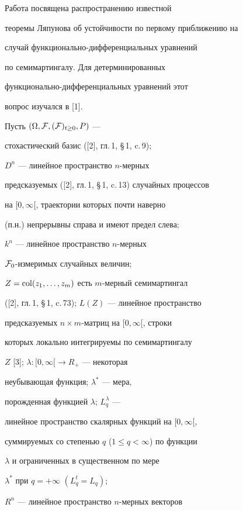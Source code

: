 \label{begin}








Работа посвящена распространению известной


теоремы Ляпунова об устойчивости по первому приближению на


случай функционально-дифференциальных уравнений


по семимартингалу. Для детерминированных


функционально-дифференциальных уравнений этот


вопрос изучался в [1].





Пусть $(\Omega, {\cal F}, ({\cal F})_{t\ge0},P)$ ---


стохастический базис ([2], гл.\,1, \S\,1, c.\,9);


$D^n$ --- линейное пространство $n$-мерных


предсказуемых ([2], гл.\,1, \S\,1, c.\,13) случайных процессов


на $[0, \infty [$, траектории которых почти наверно


(п.н.) непрерывны справа и имеют предел слева;


$k^n$ --- линейное пространство $n$-мерных


${\cal F}_0$-измеримых случайных величин;


$Z=\operatorname{col}(z_1,\dotsc,z_m)$ есть $m$-мерный семимартингал


([2], гл.\,1, \S\,1, c.\,73); $L(Z)$ --- линейное пространство


предсказуемых $n\times m$-матриц на $[0, \infty [$, строки


которых локально интегрируемы по семимартингалу


$Z$ [3]; $\lambda : [0, \infty [ \rightarrow R_+ $ --- некоторая


неубывающая функция; $\lambda ^*$ --- мера,


порожденная функцией $\lambda $; $L^\lambda _q$ ---


линейное пространство скалярных функций на $[0, \infty [$,


суммируемых со степенью $q$ ($1 \le q < \infty$) по функции


$\lambda$ и ограниченных в существенном по мере


$\lambda ^*$ при $q = +\infty $ $(L^t_q = L_q)$;


$R^n$ --- линейное пространство $n$-мерных векторов


